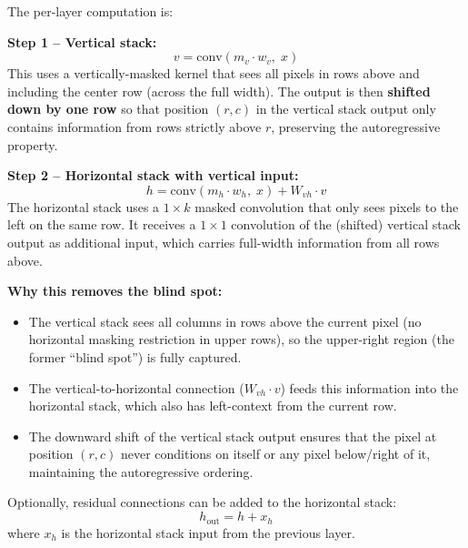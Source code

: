 \documentclass{article}
\begin{document}
{\begin{enumerate}
        The per-layer computation is:

        \textbf{Step 1 -- Vertical stack:}
        \[
            v = \mathrm{conv}(m_v \cdot w_v, \; x)
        \]
        This uses a vertically-masked kernel that sees all pixels in rows above and including the center row (across the full width). The output is then \textbf{shifted down by one row} so that position $(r,c)$ in the vertical stack output only contains information from rows strictly above $r$, preserving the autoregressive property.

        \textbf{Step 2 -- Horizontal stack with vertical input:}
        \[
            h = \mathrm{conv}(m_h \cdot w_h, \; x) + W_{vh} \cdot v
        \]
        The horizontal stack uses a $1 \times k$ masked convolution that only sees pixels to the left on the same row. It receives a $1 \times 1$ convolution of the (shifted) vertical stack output as additional input, which carries full-width information from all rows above.

        \textbf{Why this removes the blind spot:}
        \begin{itemize}
            \item The vertical stack sees all columns in rows above the current pixel (no horizontal masking restriction in upper rows), so the upper-right region (the former ``blind spot'') is fully captured.
            \item The vertical-to-horizontal connection ($W_{vh} \cdot v$) feeds this information into the horizontal stack, which also has left-context from the current row.
            \item The downward shift of the vertical stack output ensures that the pixel at position $(r,c)$ never conditions on itself or any pixel below/right of it, maintaining the autoregressive ordering.
        \end{itemize}

        Optionally, residual connections can be added to the horizontal stack:
        \[
            h_{\mathrm{out}} = h + x_h
        \]
        where $x_h$ is the horizontal stack input from the previous layer.
    \end{enumerate}
}
\end{document}
